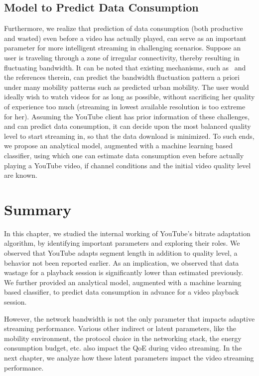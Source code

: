 \subsection{Model to Predict Data Consumption} Furthermore, we realize that prediction of data consumption (both productive and wasted) even before a video has actually played, can serve as an important parameter for more intelligent streaming in challenging scenarios.
Suppose an user is traveling through a zone of irregular connectivity, thereby resulting in fluctuating bandwidth. It can be noted that existing mechanisms, such as~\cite{Zou2015} and the references therein, can predict the bandwidth fluctuation pattern a priori under many mobility patterns such as predicted urban mobility.  
The user would ideally wish to watch videos for as long as possible, without sacrificing her quality of experience too much (streaming in lowest available resolution is too extreme for her). 
Assuming the YouTube client has prior information of these challenges, and can predict data consumption, it can decide upon the most balanced quality level to start streaming in, so that the data download is minimized.
To such ends, we propose an analytical model, augmented with a machine learning based classifier, using which one can estimate data consumption even before actually playing a YouTube video, if channel conditions and the initial video quality level are known.

\section{Summary}
In this chapter, we studied the internal working of YouTube’s bitrate
adaptation algorithm, by identifying important parameters and
exploring their roles. We observed that YouTube adapts segment
length in addition to quality level, a behavior not been reported
earlier. As an implication, we observed that data wastage for a playback session is significantly lower than estimated previously. We
further provided an analytical model, augmented with a machine
learning based classifier, to predict data consumption in advance
for a video playback session. 

However, the network bandwidth is not the only parameter that impacts adaptive streaming performance. Various other indirect or latent parameters, like the mobility environment, the protocol choice in the networking stack, the energy consumption budget, etc. also impact the \ac{QoE} during video streaming. In the next chapter, we analyze how these latent parameters impact the video streaming performance. 

